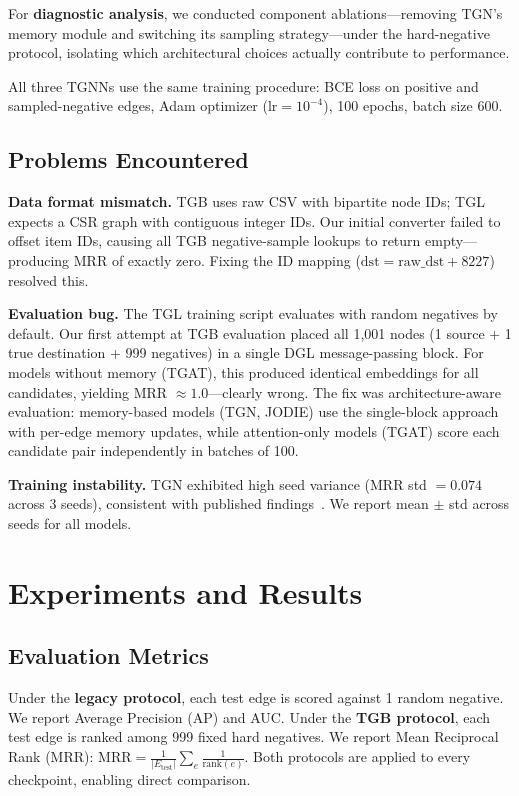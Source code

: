 \documentclass[10pt,twocolumn]{article}
\begin{document}
For \textbf{diagnostic analysis}, we conducted component ablations---removing TGN's memory module and switching its sampling strategy---under the hard-negative protocol, isolating which architectural choices actually contribute to performance.

All three TGNNs use the same training procedure: BCE loss on positive and sampled-negative edges, Adam optimizer ($\text{lr}=10^{-4}$), 100 epochs, batch size 600.

\subsection{Problems Encountered}

\textbf{Data format mismatch.}
TGB uses raw CSV with bipartite node IDs; TGL expects a CSR graph with contiguous integer IDs.
Our initial converter failed to offset item IDs, causing all TGB negative-sample lookups to return empty---producing MRR of exactly zero.
Fixing the ID mapping ($\text{dst} = \text{raw\_dst} + 8227$) resolved this.

\textbf{Evaluation bug.}
The TGL training script evaluates with random negatives by default.
Our first attempt at TGB evaluation placed all 1,001 nodes (1 source + 1 true destination + 999 negatives) in a single DGL message-passing block.
For models without memory (TGAT), this produced identical embeddings for all candidates, yielding MRR $\approx 1.0$---clearly wrong.
The fix was architecture-aware evaluation: memory-based models (TGN, JODIE) use the single-block approach with per-edge memory updates, while attention-only models (TGAT) score each candidate pair independently in batches of 100.

\textbf{Training instability.}
TGN exhibited high seed variance (MRR std $= 0.074$ across 3 seeds), consistent with published findings~\cite{huang2024tgb}.
We report mean $\pm$ std across seeds for all models.

\section{Experiments and Results}

\subsection{Evaluation Metrics}

Under the \textbf{legacy protocol}, each test edge is scored against 1 random negative.
We report Average Precision (AP) and AUC.
Under the \textbf{TGB protocol}, each test edge is ranked among 999 fixed hard negatives.
We report Mean Reciprocal Rank (MRR): $\text{MRR} = \frac{1}{|E_{\text{test}}|}\sum_{e} \frac{1}{\text{rank}(e)}$.
Both protocols are applied to every checkpoint, enabling direct comparison.
\end{document}
